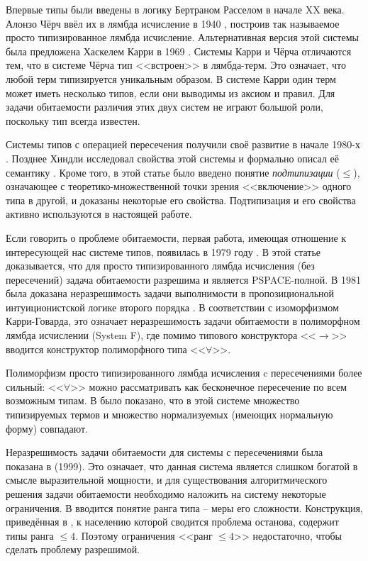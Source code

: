 \documentclass[../main.tex]{subfiles}
\begin{document}
 \label{sec:domain_review}

Впервые типы были введены в логику Бертраном Расселом в начале XX века. Алонзо Чёрч ввёл их в лямбда исчисление в 1940 \cite{church_1940}, построив так называемое просто типизированное лямбда исчисление. Альтернативная версия этой системы была предложена Хаскелем Карри в 1969 \cite{curry_1969}. Системы Карри и Чёрча отличаются тем, что в системе Чёрча тип <<встроен>> в лямбда-терм. Это означает, что любой терм типизируется уникальным образом. В системе Карри один терм может иметь несколько типов, если они выводимы из аксиом и правил. Для задачи обитаемости различия этих двух систем не играют большой роли, поскольку тип всегда известен.

Системы типов с операцией пересечения получили своё развитие в начале 1980-х \cite{coppo_1980, coppo_1981}. Позднее Хиндли исследовал свойства этой системы и формально описал её семантику \cite{hindley_1982}. Кроме того, в этой статье было введено понятие {\it подтипизации} ($\leqslant$), означающее с теоретико-множественной точки зрения <<включение>> одного типа в другой, и доказаны некоторые его свойства. Подтипизация и его свойства активно используются в настоящей работе. 

Если говорить о проблеме обитаемости, первая работа, имеющая отношение к интересующей нас системе типов, появилась в 1979 году \cite{statman_1979}. В этой статье доказывается, что для просто типизированного лямбда исчисления (без пересечений) задача обитаемости разрешима и является PSPACE-полной. В 1981 была доказана неразрешимость задачи выполнимости в пропозициональной интуиционистской логике второго порядка \cite{gabbay_1981}. В соответствии с изоморфизмом Карри-Говарда, это означает неразрешимость задачи обитаемости в полиморфном лямбда исчислении (System F), где помимо типового конструктора <<$\to$>> вводится конструктор полиморфного типа <<$\forall$>>.

Полиморфизм просто типизированного лямбда исчисления c пересечениями более сильный: <<$\forall$>> можно рассматривать как бесконечное пересечение по всем возможным типам. В \cite{pottinger_1980} было показано, что в этой системе множество типизируемых термов и множество нормализуемых (имеющих нормальную форму) совпадают. 

Неразрешимость задачи обитаемости для системы с пересечениями была показана в \cite{urzyczyn_1999} (1999). %
Это означает, что данная система является слишком богатой в смысле выразительной мощности, и для существования алгоритмического решения задачи обитаемости необходимо наложить на систему некоторые ограничения. В \cite{leivant_1983} вводится понятие ранга типа -- меры его сложности. Конструкция, приведённая в \cite{urzyczyn_1999}, к населению которой сводится проблема останова, содержит типы ранга $\leqslant 4$. Поэтому ограничения <<ранг $\leqslant 4$>> недостаточно, чтобы сделать проблему разрешимой. 
\end{document}
